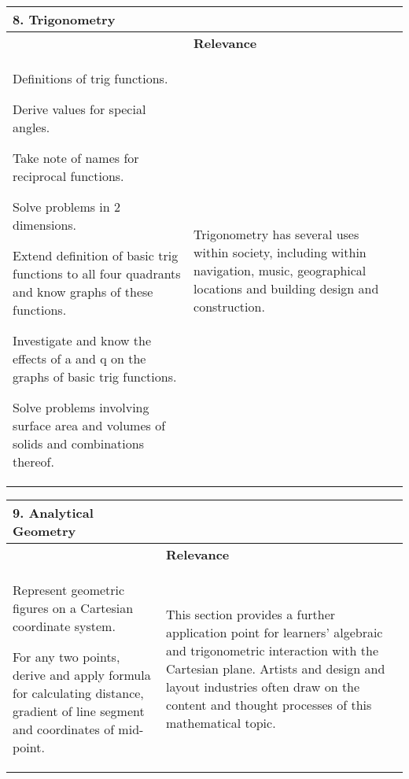 \begin{table}[H]
 \begin{center} 
\begin{tabular}{|p{8.5cm}|p{3.5cm}|} \hline
\textbf{8. Trigonometry}& \\ \hline  
&  \textbf{Relevance} \\ \hline
Definitions of trig functions.\par
Derive values for special angles.\par
Take note of names for reciprocal functions.\par
Solve problems in 2 dimensions.\par
Extend definition of basic trig functions to all four quadrants and know graphs of these functions.\par
Investigate and know the effects of a and q on the graphs of basic trig functions.\par
Solve problems involving surface area and volumes of solids and combinations thereof.
& Trigonometry has several uses within society, including within navigation, music, geographical locations and building design and construction.
\\ \hline

 \end{tabular}
\end{center}
\end{table}

\begin{table}[H]
 \begin{center} 
\begin{tabular}{|p{8.5cm}|p{3.5cm}|} \hline
\textbf{9. Analytical Geometry}& \\ \hline  
&  \textbf{Relevance} \\ \hline
Represent geometric figures on a Cartesian coordinate system.\par
For any two points, derive and apply formula for calculating distance, gradient of line segment and coordinates of mid-point.
& This section provides a further application point for learners’ algebraic and trigonometric interaction with the Cartesian plane. Artists and design and layout industries often draw on the content and thought processes of this mathematical topic.
\\ \hline

 \end{tabular}
\end{center}
\end{table}

